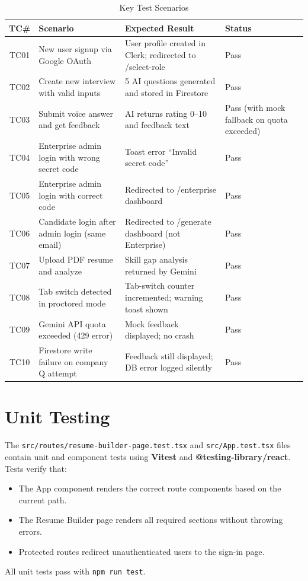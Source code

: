 \begin{table}[h!]
\centering
\caption{Key Test Scenarios}
\begin{tabular}{|c|p{5cm}|p{4cm}|p{3cm}|}
\hline
\textbf{TC\#} & \textbf{Scenario} & \textbf{Expected Result} & \textbf{Status} \\
\hline
TC01 & New user signup via Google OAuth & User profile created in Clerk; redirected to /select-role & Pass \\
\hline
TC02 & Create new interview with valid inputs & 5 AI questions generated and stored in Firestore & Pass \\
\hline
TC03 & Submit voice answer and get feedback & AI returns rating 0--10 and feedback text & Pass (with mock fallback on quota exceeded) \\
\hline
TC04 & Enterprise admin login with wrong secret code & Toast error ``Invalid secret code'' & Pass \\
\hline
TC05 & Enterprise admin login with correct code & Redirected to /enterprise dashboard & Pass \\
\hline
TC06 & Candidate login after admin login (same email) & Redirected to /generate dashboard (not Enterprise) & Pass \\
\hline
TC07 & Upload PDF resume and analyze & Skill gap analysis returned by Gemini & Pass \\
\hline
TC08 & Tab switch detected in proctored mode & Tab-switch counter incremented; warning toast shown & Pass \\
\hline
TC09 & Gemini API quota exceeded (429 error) & Mock feedback displayed; no crash & Pass \\
\hline
TC10 & Firestore write failure on company Q attempt & Feedback still displayed; DB error logged silently & Pass \\
\hline
\end{tabular}
\end{table}

\section{Unit Testing}
The \texttt{src/routes/resume-builder-page.test.tsx} and \texttt{src/App.test.tsx} files contain unit and
component tests using \textbf{Vitest} and \textbf{@testing-library/react}. Tests verify that:
\begin{itemize}
	\item The App component renders the correct route components based on the current path.
	\item The Resume Builder page renders all required sections without throwing errors.
	\item Protected routes redirect unauthenticated users to the sign-in page.
\end{itemize}
All unit tests pass with \texttt{npm run test}.

